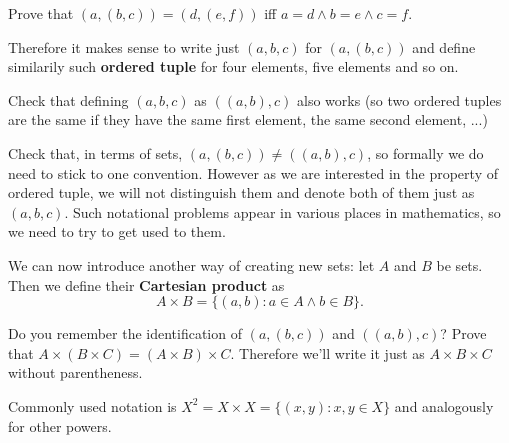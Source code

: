 \begin{prob}
Prove that $(a,(b,c))=(d,(e,f))$ iff $a=d\wedge b=e\wedge c=f$.
\end{prob}
\noindent Therefore it makes sense to write just
$(a,b,c)$ for $(a,(b,c))$ and define similarily such \textbf{ordered tuple} for four elements, five elements
and so on.
\begin{prob}
Check that defining $(a,b,c)$ as $((a,b),c)$ also works (so two ordered tuples are the same if they have the
same first element, the same second element, ...)
\end{prob}
\begin{prob}
Check that, in terms of sets, $(a,(b,c))\neq ((a,b),c)$, so formally we do need to stick to one convention.
However as we are interested in the property of ordered tuple, we will not distinguish them and denote both
of them just as $(a,b,c)$. Such notational problems appear in various places in mathematics, so we need to
try to get used to them.
\end{prob}

\noindent We can now introduce another way of creating new sets: let $A$ and $B$ be sets. Then we define their
\textbf{Cartesian product} as
$$A\times B = \{(a,b) : a\in A\wedge b\in B\}.$$

\begin{prob}
	Do you remember the identification of $(a,(b,c))$ and $((a,b),c)$? Prove that
	$A\times (B\times C) = (A\times B)\times C$. Therefore we'll write it just as $A\times B\times C$
	without parentheness.
\end{prob}

\noindent Commonly used notation is $X^2 = X\times X = \{(x,y) : x, y \in X\}$ and analogously for other powers.

